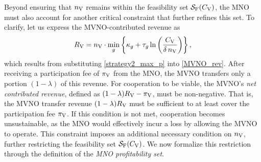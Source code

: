 \documentclass[12pt, draftclsnofoot, onecolumn]{IEEEtran}
\begin{document}
		Beyond ensuring that \( n_{\rm V} \) remains within the feasibility set \( \mathcal{S}_{\rm F}(C_{\rm V}) \), the MNO must also account for another critical constraint that further refines this set. To clarify, let us express the MVNO-contributed revenue as  
		\begin{align}
			R_{\rm V} = n_{\rm V}\cdot \min_{g} \left\{ \kappa_g+ \tau_g \ln \left( \frac{C_{\rm V}}{\delta \, n_{\rm V}} \right) \right\},
			\label{MVNO_rev2}
		\end{align}
		which results from substituting \eqref{strategy2_max_p} into \eqref{MVNO_rev}. After receiving a participation fee of \( \pi_{\rm V} \) from the MNO, the MVNO transfers only a portion \( (1-\lambda) \) of this revenue. For cooperation to be viable, the MVNO’s \emph{net contributed revenue}, defined as \( (1-\lambda) R_{\rm V} - \pi_{\rm V} \), must be non-negative. That is, the MVNO transfer revenue \( (1-\lambda) R_{\rm V} \) must be sufficient to at least cover the participation fee \( \pi_{\rm V} \). If this condition is not met, cooperation becomes unsustainable, as the MNO would effectively incur a loss by allowing the MVNO to operate. This constraint imposes an additional necessary condition on \( n_{\rm V} \), further restricting the feasibility set \( \mathcal{S}_{\rm F}(C_{\rm V}) \). We now formalize this restriction through the definition of the \emph{MNO profitability set}.
		
\end{document}
